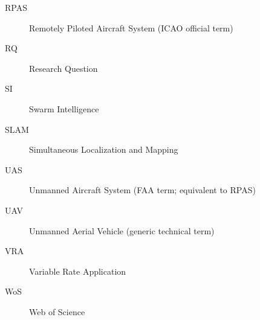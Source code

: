 \documentclass[review,3p]{elsarticle}
\begin{document}
\begin{description}
\item[RPAS]  Remotely Piloted Aircraft System (ICAO official term)
\item[RQ]    Research Question
\item[SI]    Swarm Intelligence
\item[SLAM]  Simultaneous Localization and Mapping
\item[UAS]   Unmanned Aircraft System (FAA term; equivalent to RPAS)
\item[UAV]   Unmanned Aerial Vehicle (generic technical term)
\item[VRA]   Variable Rate Application
\item[WoS]   Web of Science
\end{description}


\nocite{*}

\end{document}
